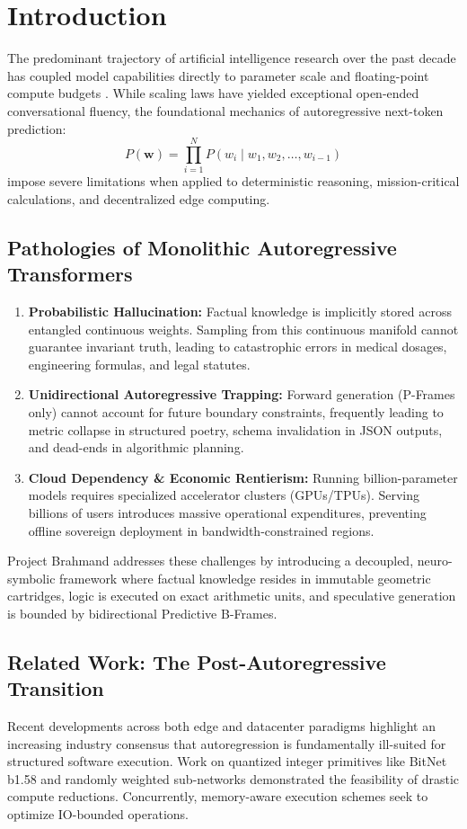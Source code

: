 \documentclass[11pt,a4paper]{article}
\theoremstyle{definition}
\begin{document}
\section{Introduction}
The predominant trajectory of artificial intelligence research over the past decade has coupled model capabilities directly to parameter scale and floating-point compute budgets \cite{vaswani2017attention, wang2024bitnet}. While scaling laws have yielded exceptional open-ended conversational fluency, the foundational mechanics of autoregressive next-token prediction:
\begin{equation}
P(\mathbf{w}) = \prod_{i=1}^N P(w_i \mid w_1, w_2, \dots, w_{i-1})
\end{equation}
impose severe limitations when applied to deterministic reasoning, mission-critical calculations, and decentralized edge computing.

\subsection{Pathologies of Monolithic Autoregressive Transformers}
\begin{enumerate}
    \item \textbf{Probabilistic Hallucination:} Factual knowledge is implicitly stored across entangled continuous weights. Sampling from this continuous manifold cannot guarantee invariant truth, leading to catastrophic errors in medical dosages, engineering formulas, and legal statutes.
    \item \textbf{Unidirectional Autoregressive Trapping:} Forward generation (P-Frames only) cannot account for future boundary constraints, frequently leading to metric collapse in structured poetry, schema invalidation in JSON outputs, and dead-ends in algorithmic planning.
    \item \textbf{Cloud Dependency \& Economic Rentierism:} Running billion-parameter models requires specialized accelerator clusters (GPUs/TPUs). Serving billions of users introduces massive operational expenditures, preventing offline sovereign deployment in bandwidth-constrained regions.
\end{enumerate}

Project Brahmand addresses these challenges by introducing a decoupled, neuro-symbolic framework where factual knowledge resides in immutable geometric cartridges, logic is executed on exact arithmetic units, and speculative generation is bounded by bidirectional Predictive B-Frames.

\subsection{Related Work: The Post-Autoregressive Transition}
Recent developments across both edge and datacenter paradigms highlight an increasing industry consensus that autoregression is fundamentally ill-suited for structured software execution. Work on quantized integer primitives like BitNet b1.58 \cite{wang2024bitnet} and randomly weighted sub-networks \cite{ramanujan2020whats} demonstrated the feasibility of drastic compute reductions. Concurrently, memory-aware execution schemes \cite{dao2022flashattention} seek to optimize IO-bounded operations. 
\end{document}

